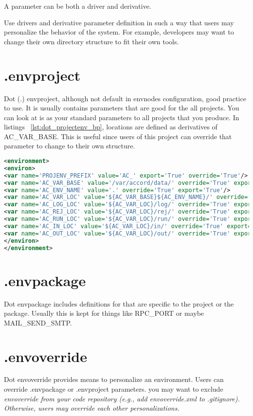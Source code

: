 \documentclass[design.tex]{subfiles}
\begin{document}
A parameter can be both a driver and derivative.

Use drivers and derivative parameter definition in such a way that users may personalize the behavior of the system.  For example, developers may want to change their own directory structure to fit their own tools.
 

\section{.envproject}
Dot (.) envproject, although not default in envnodes configuration, good practice to use.  It is usually contains parameters that are good for the all projects.  You can look at is as your standard parameters to all projects that you produce. In listings ~\ref{lst:dot_projectenv_bp}, locations are defined as derivatives of AC\_VAR\_BASE. This is useful since users of this project can override that parameter to change to their own structure.

\begin{lstlisting}[language=XML, label=lst:dot_envproject_bp, caption='.envproject.xml example']
<environment>
<environ>
<var name='PROJENV_PREFIX' value='AC_' export='True' override='True'/>
<var name='AC_VAR_BASE' value='/var/accord/data/' override='True' export='True'/>
<var name='AC_ENV_NAME' value='.' override='True' export='True'/>
<var name='AC_VAR_LOC' value='${AC_VAR_BASE}${AC_ENV_NAME}/' override='True' export='True'/>
<var name='AC_LOG_LOC' value='${AC_VAR_LOC}/log/' override='True' export='True'/>
<var name='AC_REJ_LOC' value='${AC_VAR_LOC}/rej/' override='True' export='True'/>
<var name='AC_RUN_LOC' value='${AC_VAR_LOC}/run/' override='True' export='True'/>
<var name='AC_IN_LOC' value='${AC_VAR_LOC}/in/' override='True' export='True'/>
<var name='AC_OUT_LOC' value='${AC_VAR_LOC}/out/' override='True' export='True'/>
</environ>
</environment>
\end{lstlisting}

\section{.envpackage}
Dot envpackage includes definitions for that are specific to the project or the package.  Usually this is kept for things like RPC\_PORT or maybe MAIL\_SEND\_SMTP. 

\section{.envoverride}
Dot envoverride provides means to personalize an environment.  Users can override .envpackage or .envproject parameters.
you may want to exclude \em{envoverride} from your code repository (e.g., add envoverride.xml to .gitignore).  Otherwise, users may override each other personalizations. 
\end{document}

